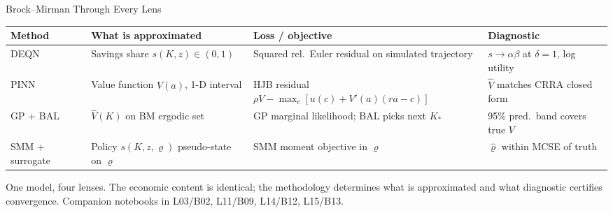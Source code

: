 \documentclass[aspectratio=169,11pt]{beamer}
\begin{document}
\begin{frame}{Brock--Mirman Through Every Lens}
\scriptsize
\begin{center}
\begin{tabular}{p{}p{}p{}p{}}
\toprule
\textbf{Method} & \textbf{What is approximated} & \textbf{Loss / objective} & \textbf{Diagnostic} \\
\midrule
DEQN              & Savings share $s(K,z)\in(0,1)$              & Squared rel.\ Euler residual on simulated trajectory & $s\to\alpha\beta$ at $\delta=1$, log utility \\
PINN              & Value function $\hat V(a)$, 1-D interval     & HJB residual $\rho V-\max_c[u(c)+V'(a)(ra-c)]$ & $\hat V$ matches CRRA closed form \\
GP + BAL          & $\hat V(K)$ on BM ergodic set                & GP marginal likelihood; BAL picks next $K_*$ & 95\% pred.\ band covers true $V$ \\
SMM + surrogate   & Policy $s(K,z,\varrho)$ pseudo-state on $\varrho$ & SMM moment objective in $\varrho$ & $\hat\varrho$ within MCSE of truth \\
\bottomrule
\end{tabular}
\end{center}

\vspace{0.15cm}
\footnotesize
One model, four lenses. The economic content is identical; the methodology determines what is approximated and what diagnostic certifies convergence.  Companion notebooks in L03/B02, L11/B09, L14/B12, L15/B13.
\end{frame}
\end{document}
